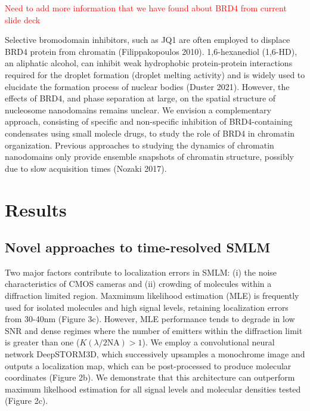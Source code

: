 \documentclass{ucetd}
\begin{document}
\textcolor{red}{Need to add more information that we have found about BRD4 from current slide deck}

Selective bromodomain inhibitors, such as JQ1 are often employed to displace BRD4 protein from chromatin (Filippakopoulos 2010). 1,6-hexanediol (1,6-HD), an aliphatic alcohol, can inhibit weak hydrophobic protein-protein interactions required for the droplet formation (droplet melting activity) and is widely used to elucidate the formation process of nuclear bodies (Duster 2021). However, the effects of BRD4, and phase separation at large, on the spatial structure of nucleosome nanodomains remains unclear. We envision a complementary approach, consisting of specific and non-specific inhibition of BRD4-containing condensates using small molecle drugs, to study the role of BRD4 in chromatin organization. Previous approaches to studying the dynamics of chromatin nanodomains only provide ensemble snapshots of chromatin structure, possibly due to slow acquisition times (Nozaki 2017). 


\section{Results}

\subsection{Novel approaches to time-resolved SMLM}

Two major factors contribute to localization errors in SMLM: (i) the noise characteristics of CMOS cameras and (ii) crowding of molecules within a diffraction limited region. Maxmimum likelihood estimation (MLE) is frequently used for isolated molecules and high signal levels, retaining localization errors from 30-40nm (Figure 3c). However, MLE performance tends to degrade in low SNR and dense regimes where the number of emitters within the diffraction limit is greater than one ($K(\lambda/2\mathrm{NA}) > 1$). We employ a convolutional neural network DeepSTORM3D, which successively upsamples a monochrome image and outputs a localization map, which can be post-processed to produce molecular coordinates (Figure 2b).  We demonstrate that this architecture can outperform maximum likelhood estimation for all signal levels and molecular densities tested (Figure 2c).
\end{document}
